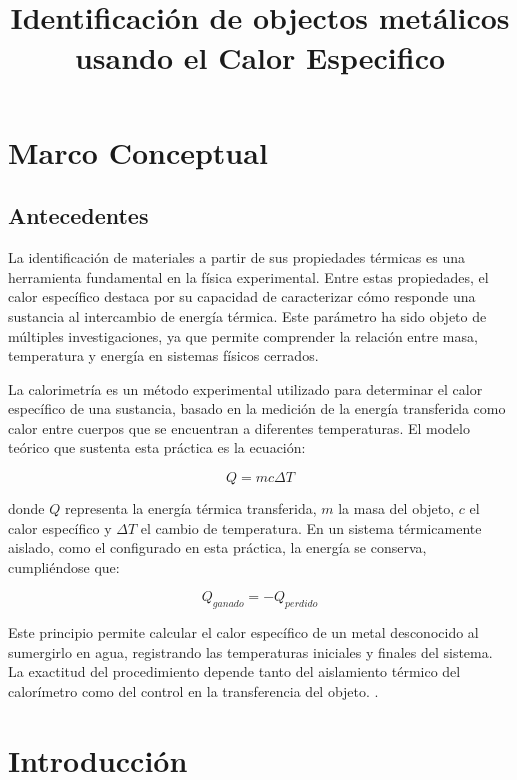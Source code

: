 \documentclass[12pt,a4paper]{config/myConfig}
\title{\Large $\ $\\ \bf Identificación de objectos metálicos usando el Calor Especifico}
\author
\newcommand{\AssigmentNumber}{Practica 7}
\newcommand{\AssigmentDate}{4 Mayo del 2025}
\begin{document}
\thispagestyle{myheadings}
\pagestyle{myheadings}
\markright{\tt \AssigmentNumber|    \AssigmentDate}%



\section{Marco Conceptual}
\label{sec:MARCO-CONCEPTUAL}

\subsection{Antecedentes}
\label{sec:ANTECEDENTES}

La identificación de materiales a partir de sus propiedades térmicas es una herramienta fundamental en la física experimental. Entre estas propiedades, el calor específico destaca por su capacidad de caracterizar cómo responde una sustancia al intercambio de energía térmica. Este parámetro ha sido objeto de múltiples investigaciones, ya que permite comprender la relación entre masa, temperatura y energía en sistemas físicos cerrados.

La calorimetría es un método experimental utilizado para determinar el calor específico de una sustancia, basado en la medición de la energía transferida como calor entre cuerpos que se encuentran a diferentes temperaturas. El modelo teórico que sustenta esta práctica es la ecuación:

\begin{equation}
Q = mc\Delta T
\end{equation}

donde $Q$ representa la energía térmica transferida, $m$ la masa del objeto, $c$ el calor específico y $\Delta T$ el cambio de temperatura. En un sistema térmicamente aislado, como el configurado en esta práctica, la energía se conserva, cumpliéndose que:

\begin{equation}
Q_{ganado} = -Q_{perdido}
\end{equation}

Este principio permite calcular el calor específico de un metal desconocido al sumergirlo en agua, registrando las temperaturas iniciales y finales del sistema. La exactitud del procedimiento depende tanto del aislamiento térmico del calorímetro como del control en la transferencia del objeto. \textcite{physicsTextbook}.

\section{Introducción}
\label{sec:INTRODUCCION}
\end{document}
